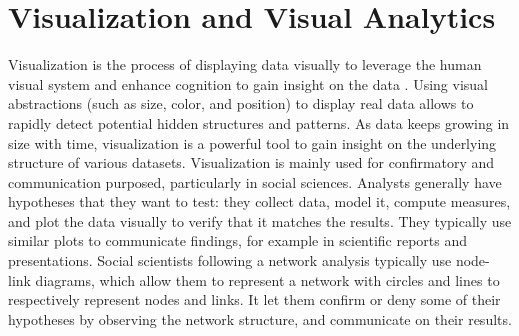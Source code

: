 %


\section{Visualization and Visual Analytics}

Visualization is the process of displaying data visually to leverage the human visual system and enhance cognition to gain insight on the data \cite{cardReadingsInformationVisualization1999}.
Using visual abstractions (such as size, color, and position) to display real data allows to rapidly detect potential hidden structures and patterns.
As data keeps growing in size with time, visualization is a powerful tool to gain insight on the underlying structure of various datasets.
Visualization is mainly used for confirmatory and communication purposed, particularly in social sciences.
Analysts generally have hypotheses that they want to test: they collect data, model it, compute measures, and plot the data visually to verify that it matches the results.
They typically use similar plots to communicate findings, for example in scientific reports and presentations.
Social scientists following a network analysis typically use node-link diagrams, which allow them to represent a network with circles and lines to respectively represent nodes and links.
It let them confirm or deny some of their hypotheses by observing the network structure, and communicate on their results.

